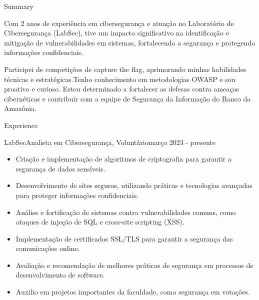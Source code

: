 \documentclass[]{mcdowellcv}
\begin{document}
\makeheader

\begin{cvsection}{Summary}
        \vspace{\baselineskip}
	\item Com 2 anos de experiência em cibersegurança e atuação no Laboratório de Cibersegurança (LabSec), tive um impacto significativo na identificação e mitigação de vulnerabilidades em sistemas, fortalecendo a segurança e protegendo informações confidenciais. 
        \item Participei de competições de capture the flag, aprimorando minhas habilidades técnicas e estratégicas.Tenho conhecimento em metodologias OWASP e sou proativo e curioso. Estou determinado a fortalecer as defesas contra ameaças cibernéticas e contribuir com a equipe de Segurança da Informação do Banco da Amazônia.
\end{cvsection}

\begin{cvsection}{Experience}
	\begin{cvsubsection}{LabSec}{Analista em Cibersegurança, Voluntário}{março 2023 - presente}
		\begin{itemize}
                \vspace{\baselineskip}
                \item Criação e implementação de algoritmos de criptografia para garantir a segurança de dados sensíveis.
			\item Desenvolvimento de sites seguros, utilizando práticas e tecnologias avançadas para proteger informações confidenciais.
			\item Análise e fortificação de sistemas contra vulnerabilidades comuns, como ataques de injeção de SQL e cross-site scripting (XSS).
			\item Implementação de certificados SSL/TLS para garantir a segurança das comunicações online.
			\item Avaliação e recomendação de melhores práticas de segurança em processos de desenvolvimento de software.
			\item Auxilio em projetos importantes da faculdade, como segurança em votações.
		\end{itemize}
	\end{cvsubsection}
\end{cvsection}
\end{document}
